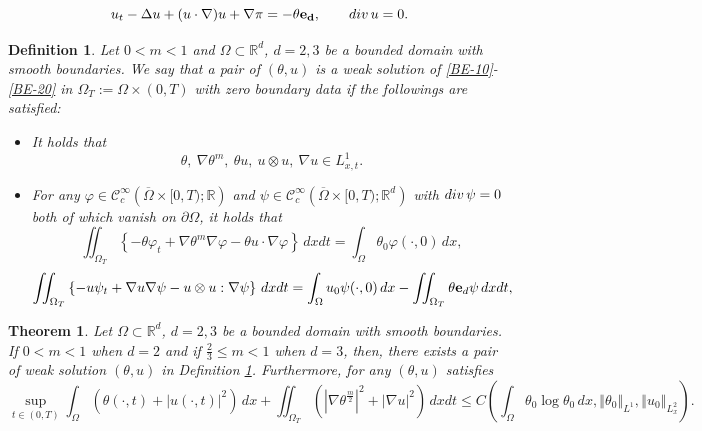 \documentclass[10pt,a4paper]{amsart}
\newtheorem{defn}{Definition}
\newtheorem{theorem}{Theorem}
\newcommand{\R}{{ \mathbb{R}  }}
\newcommand{\abs}[1]{\left| #1 \right|}
\newcommand{\bke}[1]{\left( #1 \right)}
\newcommand{\norm}[1]{\left\Vert #1 \right\Vert}
\begin{document}
\begin{equation}\label{BE-20}
u_t-\Delta u+(u\cdot \nabla) u+\nabla \pi=-\theta {\bf{e}_d},\qquad {\rm div}\,u=0.
\end{equation}

\begin{defn}\label{Weak-ks} Let $0<m<1$ and $\Omega\subset\R^d$, $d=2,3$ be a bounded domain with smooth boundaries. We say that a pair of $(\theta, u)$ is a  weak solution of \eqref{BE-10}-\eqref{BE-20} in $\Omega_{T} := \Omega \times (0, T)$ with zero boundary data if the followings are satisfied:
\begin{itemize}
	\item [(i)] It holds that 
	\[
	\theta , \ \nabla \theta^m, \ \theta u , \ u\otimes u, \ \nabla u \in L_{x,t}^{1}.
	\]
	
	\item [(ii)] For any $\varphi \in \mathcal{C}_{c}^{\infty} \left(\overline{\Omega} \times [0, T);\R\right)$ and $\psi \in \mathcal{C}_{c}^{\infty} \left(\overline{\Omega} \times [0, T);\R^d\right)$ with $\rm{div}\,\psi=0$ both of which vanish on $\partial\Omega$, it holds that 
	\[
	\iint_{\Omega_{T}} \left\{ - \theta \varphi_t + \nabla \theta^m \nabla \varphi - \theta u\cdot \nabla \varphi \right\} \,dxdt = \int_{\Omega}\theta_0 \varphi(\cdot,0) \,dx,
	\]
	\[
	\iint_{\Omega_{T}} \left\{ - u \psi_t + \nabla u \nabla \psi - u\otimes u:\nabla \psi \right\} \,dxdt = \int_{\Omega}u_0 \psi(\cdot,0) \,dx-\iint_{\Omega_{T}}  \theta {\bf e}_d  \psi \,dxdt,
	\]
\end{itemize}	
\end{defn}

\begin{theorem}
Let  $\Omega\subset\R^d$, $d=2,3$ be a bounded domain with smooth boundaries. 
If $0< m <1$ when $d=2$ and if $\frac{2}{3} \le m<1$ when $d=3$, then,
there exists a pair of weak solution $(\theta, u)$ in Definition \ref{Weak-ks}. Furthermore, for any  $(\theta, u)$ satisfies 
\begin{equation}\label{BS-energy}
\sup_{t\in (0, T)} \int_{\Omega} (\theta(\cdot, t) +\abs{u(\cdot, t)}^2) \,dx
+\iint_{\Omega_T} (\left|\nabla \theta^{\frac{m}{2}}\right|^{2} +\abs{\nabla u}^2) \,dxdt\le C\bke{\int_{\Omega}\theta_0 \log \theta_0 \,dx,  \norm{\theta_0}_{L^1}, \norm{u_0}_{L^{2}_{x}}}.
\end{equation}
\end{theorem}
\end{document}
